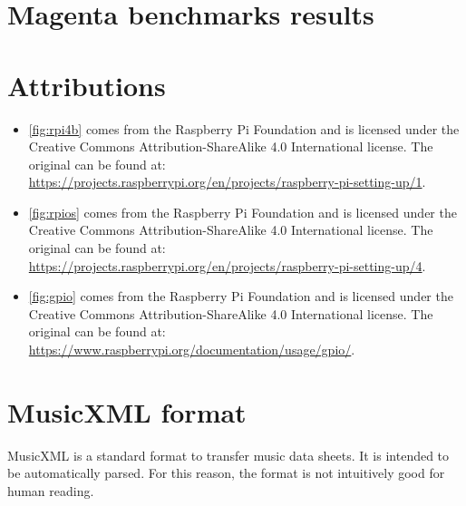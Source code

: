 \appendix
\appendixpage

\section{Magenta benchmarks results}
\label{appendix:magenta_benchmark}
\begin{minipage}{\linewidth}
    \begin{adjustbox}{width=\textwidth}
    \end{adjustbox}
\end{minipage}

\section{Attributions}

\begin{itemize}
    \item \autoref{fig:rpi4b} comes from the Raspberry Pi Foundation and is licensed under the Creative
          Commons Attribution-ShareAlike 4.0 International license. The original can be found at:
          \url{https://projects.raspberrypi.org/en/projects/raspberry-pi-setting-up/1}.

    \item \autoref{fig:rpios} comes from the Raspberry Pi Foundation and is licensed under the Creative
          Commons Attribution-ShareAlike 4.0 International license. The original can be found at:
          \url{https://projects.raspberrypi.org/en/projects/raspberry-pi-setting-up/4}.

    \item \autoref{fig:gpio} comes from the Raspberry Pi Foundation and is licensed under the Creative
          Commons Attribution-ShareAlike 4.0 International license. The original can be found at:
          \url{https://www.raspberrypi.org/documentation/usage/gpio/}.
\end{itemize}

\section{MusicXML format}

MusicXML is a standard format to transfer music data sheets. It is intended to be
automatically parsed. For this reason, the format is not intuitively good for human
reading.

